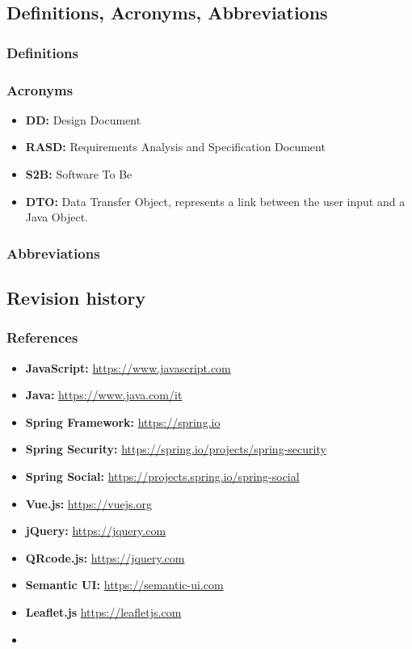 \documentclass[table, 12pt]{article}
\begin{document}
\subsection{Definitions, Acronyms, Abbreviations}
\subsubsection{Definitions}
\subsubsection{Acronyms}
\begin{itemize}
    \item \textbf{DD:} Design Document
    \item \textbf{RASD:} Requirements Analysis and Specification Document
    \item \textbf{S2B:} Software To Be
    \item \textbf{DTO:} Data Transfer Object, represents a link between the user input and a Java Object.
\end{itemize}
\subsubsection{Abbreviations}
\subsection{Revision history}

\subsubsection{References}
\begin{itemize}
    \item \textbf{JavaScript: } \href{https://www.javascript.com}{https://www.javascript.com}
    \item \textbf{Java: } \href{https://www.java.com/it}{https://www.java.com/it}
    \item \textbf{Spring Framework: } \href{https://spring.io}{https://spring.io}
    \item \textbf{Spring Security: } \href{https://spring.io/projects/spring-security}{https://spring.io/projects/spring-security}
    \item \textbf{Spring Social: } \href{https://projects.spring.io/spring-social}{https://projects.spring.io/spring-social}
    \item \textbf{Vue.js: } \href{https://vuejs.org}{https://vuejs.org}
    \item \textbf{jQuery: } \href{https://jquery.com}{https://jquery.com}
    \item \textbf{QRcode.js: } \href{https://jquery.com}{https://jquery.com}
    \item \textbf{Semantic UI: } \href{https://semantic-ui.com}{https://semantic-ui.com}
    \item \textbf{Leaflet.js} \href{https://leafletjs.com}{https://leafletjs.com}
    \item \textbf{} \href{}{}
\end{itemize}
\end{document}
